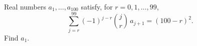 Real numbers $a_1,\ldots,a_{100}$ satisfy, for $r=0,1,\ldots,99$,
\[
\sum_{j=r}^{99}(-1)^{j-r}\binom jr\,a_{j+1}=(100-r)^2.
\]
Find $a_1$.
